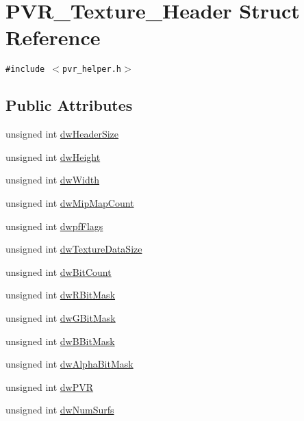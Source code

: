 \hypertarget{struct_p_v_r___texture___header}{
\section{PVR\_\-Texture\_\-Header Struct Reference}
\label{struct_p_v_r___texture___header}
}
{\tt \#include $<$pvr\_\-helper.h$>$}

\subsection*{Public Attributes}
\begin{CompactItemize}
\item 
unsigned int \hyperlink{struct_p_v_r___texture___header_1b70d66c96e4291a170028d0ba6bac0e}{dwHeaderSize}
\item 
unsigned int \hyperlink{struct_p_v_r___texture___header_5c9d7a15be622005fae8247ea1d593df}{dwHeight}
\item 
unsigned int \hyperlink{struct_p_v_r___texture___header_35506d49c7fb8fe89cf2d35ec1727bdd}{dwWidth}
\item 
unsigned int \hyperlink{struct_p_v_r___texture___header_40241f20ad91369c72a9f7285b8c4ff5}{dwMipMapCount}
\item 
unsigned int \hyperlink{struct_p_v_r___texture___header_b89dc74cf18383d2d41397e2e839faeb}{dwpfFlags}
\item 
unsigned int \hyperlink{struct_p_v_r___texture___header_d2a7eea61233461d085191891734177f}{dwTextureDataSize}
\item 
unsigned int \hyperlink{struct_p_v_r___texture___header_dc064257d63a00e00e131c7d93728067}{dwBitCount}
\item 
unsigned int \hyperlink{struct_p_v_r___texture___header_94f02eef9ff95c18c3922ce84b3e59da}{dwRBitMask}
\item 
unsigned int \hyperlink{struct_p_v_r___texture___header_2acd87653ac81f7d304112b48e92bec8}{dwGBitMask}
\item 
unsigned int \hyperlink{struct_p_v_r___texture___header_9f60e62a5fb60d092357965c265d723d}{dwBBitMask}
\item 
unsigned int \hyperlink{struct_p_v_r___texture___header_63720b915d8a00edd8d918c91e533cd3}{dwAlphaBitMask}
\item 
unsigned int \hyperlink{struct_p_v_r___texture___header_1aa3e8921cb7576374622129a952dd72}{dwPVR}
\item 
unsigned int \hyperlink{struct_p_v_r___texture___header_b5a48ebff7ae60e21b335fb7f8d1c2e3}{dwNumSurfs}
\end{CompactItemize}


